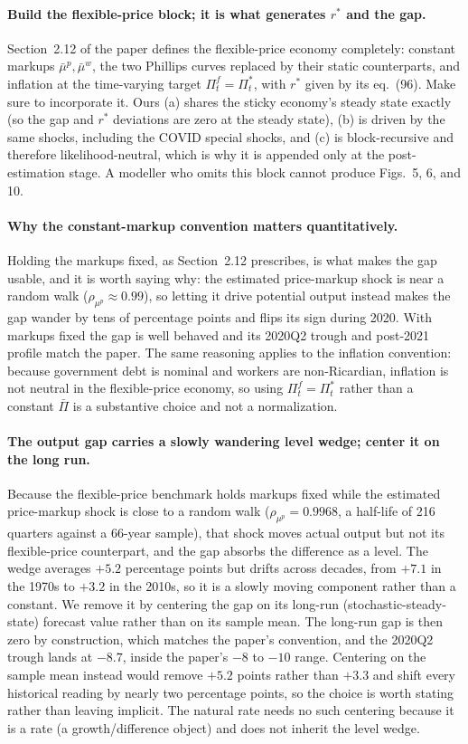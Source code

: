 \documentclass[11pt]{article}
\theoremstyle{definition}
\newcommand{\rstar}{r^{*}}
\begin{document}
\paragraph{Build the flexible-price block; it is what generates $\rstar$ and the gap.}
Section~2.12 of the paper defines the flexible-price economy completely: constant markups
$\bar\mu^p,\bar\mu^w$, the two Phillips curves replaced by their static counterparts, and inflation at
the time-varying target $\Pi^f_t=\Pi^*_t$, with $\rstar$ given by its eq.\ (96). Make sure to
incorporate it. Ours (a) shares the sticky economy's steady state exactly (so the gap and $\rstar$
deviations are zero at the steady state), (b) is driven by the same shocks, including the COVID special
shocks, and (c) is block-recursive and therefore likelihood-neutral, which is why it is appended only at
the post-estimation stage. A modeller who omits this block cannot produce Figs.\ 5, 6, and 10.

\paragraph{Why the constant-markup convention matters quantitatively.}
Holding the markups fixed, as Section~2.12 prescribes, is what makes the gap usable, and it is worth
saying why: the estimated price-markup shock is near a random walk ($\rho_{\mu^p}\approx0.99$), so
letting it drive potential output instead makes the gap wander by tens of percentage points and flips
its sign during 2020. With markups fixed the gap is well behaved and its 2020Q2 trough and post-2021
profile match the paper. The same reasoning applies to the inflation convention: because government debt
is nominal and workers are non-Ricardian, inflation is not neutral in the flexible-price economy, so
using $\Pi^f_t=\Pi^*_t$ rather than a constant $\bar\Pi$ is a substantive choice and not a normalization.

\paragraph{The output gap carries a slowly wandering level wedge; center it on the long run.}
Because the flexible-price benchmark holds markups fixed while the estimated price-markup shock is
close to a random walk ($\rho_{\mu^p}=0.9968$, a half-life of 216 quarters against a 66-year sample),
that shock moves actual output but not its flexible-price counterpart, and the gap absorbs the
difference as a level. The wedge averages $+5.2$ percentage points but drifts across decades, from
$+7.1$ in the 1970s to $+3.2$ in the 2010s, so it is a slowly moving component rather than a constant.
We remove it by centering the gap on its long-run (stochastic-steady-state) forecast value rather than
on its sample mean. The long-run gap is then zero by construction, which matches the paper's
convention, and the 2020Q2 trough lands at $-8.7$, inside the paper's $-8$ to $-10$ range. Centering on
the sample mean instead would remove $+5.2$ points rather than $+3.3$ and shift every historical
reading by nearly two percentage points, so the choice is worth stating rather than leaving implicit.
The natural rate needs no such centering because it is a rate (a growth/difference object) and does not
inherit the level wedge.
\end{document}
